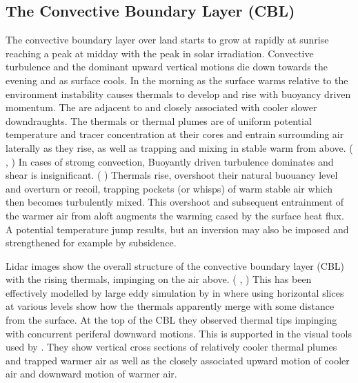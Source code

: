 \subsection{The Convective Boundary Layer (CBL)}

The convective boundary layer over land starts to grow at rapidly at sunrise reaching a peak at midday with the peak in solar irradiation.
Convective turbulence and the dominant upward vertical motions die down towards the evening and as surface cools. In the morning as the 
surface warms relative to the environment instability causes thermals to develop and rise with buoyancy driven momentum. The are adjacent to 
and closely associated with cooler slower downdraughts.  The thermals or thermal plumes are of uniform potential temperature and tracer 
concentration at their cores and entrain surrounding air laterally as they rise, as well as trapping and mixing in stable warm from above. 
(\citeauthor{Stull-BLMetIntro} \cite{Stull-BLMetIntro}, \citeauthor{CrumStullEl} \cite{CrumStullEl}) In cases of stromg convection, 
Buoyantly driven turbulence dominates and shear is insignificant. (\citeauthor{DirLEddy} \cite{DirLEddy}) Thermals rise, overshoot their
natural buouancy level and overturn or recoil, trapping pockets (or whisps) of warm stable air which then becomes turbulently mixed.  This
overshoot and subsequent entrainment of the warmer air from aloft augments the warming cased by the surface heat flux.  A potential
temperature jump results, but an inversion may also be imposed and strengthened for example by subsidence.  

Lidar images show the overall structure of the convective boundary layer (\acs{CBL}) with the rising thermals, impinging on the air above.
(\citeauthor{CrumStullEl} \cite{CrumStullEl}, \citeauthor{Traum11} \cite{Traum11}) This has been effectively modelled by large eddy simulation
by \citeauthor{SchmidtSchu} in \cite{SchmidtSchu} where using horizontal slices at various levels show how the thermals apparently merge 
with some distance from the surface.  At the top of the \acs{CBL} they observed thermal tips impinging with concurrent periferal downward motions.
This is supported in the visual tools used by \citeauthor{SullMoengStev} \cite{SullMoengStev}.  They show vertical cross sections of relatively cooler thermal plumes and trapped warmer air as well as the closely associated upward motion of cooler air and downward motion of warmer air.\\ 

